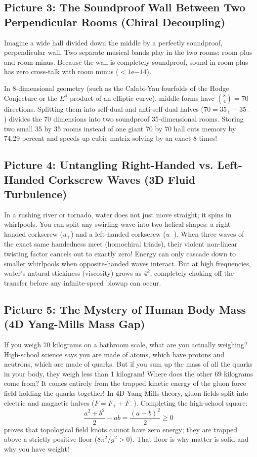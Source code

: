 \documentclass[11pt,a4paper]{article}
\begin{document}
\subsection{Picture 3: The Soundproof Wall Between Two Perpendicular Rooms (Chiral Decoupling)}
Imagine a wide hall divided down the middle by a perfectly soundproof, perpendicular wall. Two separate musical bands play in the two rooms: room plus and room minus. Because the wall is completely soundproof, sound in room plus has zero cross-talk with room minus ($< 1\mathrm{e}{-14}$). 

In 8-dimensional geometry (such as the Calabi-Yau fourfolds of the Hodge Conjecture or the $E^4$ product of an elliptic curve), middle forms have $\binom{8}{4} = 70$ directions. Splitting them into self-dual and anti-self-dual halves ($70 = 35_+ + 35_-$) divides the 70 dimensions into two soundproof 35-dimensional rooms. Storing two small 35 by 35 rooms instead of one giant 70 by 70 hall cuts memory by 74.29 percent and speeds up cubic matrix solving by an exact 8 times!

\subsection{Picture 4: Untangling Right-Handed vs. Left-Handed Corkscrew Waves (3D Fluid Turbulence)}
In a rushing river or tornado, water does not just move straight; it spins in whirlpools. You can split any swirling wave into two helical shapes: a right-handed corkscrew ($u_+$) and a left-handed corkscrew ($u_-$).
When three waves of the exact same handedness meet (homochiral triads), their violent non-linear twisting factor cancels out to exactly zero! Energy can only cascade down to smaller whirlpools when opposite-handed waves interact. But at high frequencies, water's natural stickiness (viscosity) grows as $4^k$, completely choking off the transfer before any infinite-speed blowup can occur.

\subsection{Picture 5: The Mystery of Human Body Mass (4D Yang-Mills Mass Gap)}
If you weigh 70 kilograms on a bathroom scale, what are you actually weighing? High-school science says you are made of atoms, which have protons and neutrons, which are made of quarks. But if you sum up the mass of all the quarks in your body, they weigh less than 1 kilogram! Where does the other 69 kilograms come from?
It comes entirely from the trapped kinetic energy of the gluon force field holding the quarks together! In 4D Yang-Mills theory, gluon fields split into electric and magnetic halves ($F = F_+ + F_-$). Completing the high-school square:
\begin{equation}
\frac{a^2 + b^2}{2} - ab = \frac{(a - b)^2}{2} \ge 0
\end{equation}
proves that topological field knots cannot have zero energy; they are trapped above a strictly positive floor ($8\pi^2/g^2 > 0$). That floor is why matter is solid and why you have weight!
\end{document}
